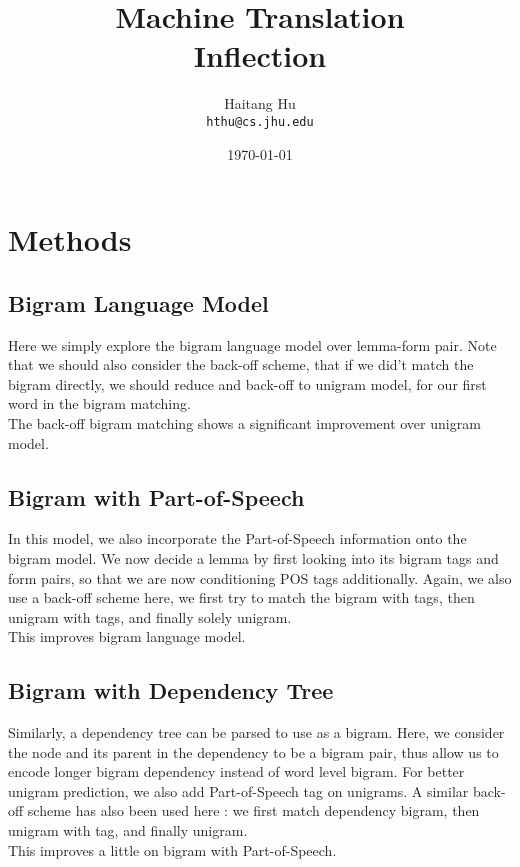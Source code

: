 \documentclass[11pt]{article}
\title{Machine Translation\\Inflection}
\author{Haitang Hu \\
  {\tt hthu@cs.jhu.edu}}
\date{\today}
\begin{document}
\large
\maketitle
\thispagestyle{headings}
\section{Methods} %
\label{sec:methods}
\subsection{Bigram Language Model} %
\label{sub:bigram_}
Here we simply explore the bigram language model over lemma-form pair. Note that we should also consider the back-off scheme, that if we did't match the bigram directly, we should reduce and back-off to unigram model, for our first word in the bigram matching.\\
The back-off bigram matching shows a significant improvement over unigram model.

\subsection{Bigram with Part-of-Speech} %
\label{sub:bigram_with_part_of_speech}
In this model, we also incorporate the Part-of-Speech information onto the bigram model. We now decide a lemma by first looking into its bigram tags and form pairs, so that we are now conditioning POS tags additionally. Again, we also use a back-off scheme here, we first try to match the bigram with tags, then unigram with tags, and finally solely unigram.\\
This improves bigram language model.

\subsection{Bigram with Dependency Tree} %
\label{sub:bigram_with_dependency_tree}
Similarly, a dependency tree can be parsed to use as a bigram. Here, we consider the node and its parent in the dependency to be a bigram pair, thus allow us to encode longer bigram dependency instead of word level bigram. For better unigram prediction, we also add Part-of-Speech tag on unigrams. A similar back-off scheme has also been used here : we first match dependency bigram, then unigram with tag, and finally unigram.\\
This improves a little on bigram with Part-of-Speech.
\end{document}
